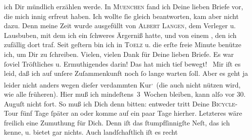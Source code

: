 \begin{ledgroupsized}[t]{13cm}
               ich Dir mündlich erzählen werde.\pend
           \pstart
           In \textsc{Muenchen} fand ich Deine lieben Briefe vor, die mich innig erfreut haben. Ich wollte ſie
               gleich beantworten, kam aber nicht dazu. Denn meine Zeit wurde ausgefüllt von \textsc{Albert Langen}, dem Verleger u. Lausbuben, mit dem ich ein
               ſchweres Ärgerniß hatte, und von einem \label{K_L02743-1v}\label{K_L02743-1h}, den ich
               zufällig dort traf. Seit geſtern bin ich in \textsc{Toelz} u. die erſte freie Minute benütze ich, um Dir zu ſchreiben.\pend
           \pstart
           Vielen, vielen Dank für Deine lieben Briefe. Es war ſoviel Tröſtliches u.
               Ermuthigendes darin! Das hat mich tief bewegt! {\dotsfive}\pend
           \pstart
           Mir iſt es leid, daß ich auf unſere Zuſammenkunft noch ſo lange warten {\pb}ſoll. Aber es geht ja leider nicht anders wegen
               dieſer verdammten Kur\substVorne{}\textsuperscript{,}\substDazwischen{} (\substHinten{}die auch nicht nützen wird, wie alle früheren). Hier muß ich
               mindeſtens 3 Wochen bleiben, kann alſo vor 30.{ }Auguſt nicht fort. So muß ich Dich denn bitten: entweder
               tritt Deine \textsc{Bicycle}-Tour fünf Tage ſpäter an {\pb}oder komme auf ein paar Tage hierher. Letzteres wäre
               freilich eine  Zumuthung für Dich. Denn \label{K_L02743-2v}\label{K_L02743-2h} iſt das ſtumpfſinnigſte Neſt, das ich kenne, u.  bietet gar nichts. Auch landſchaftlich iſt es recht

\end{ledgroupsized}
